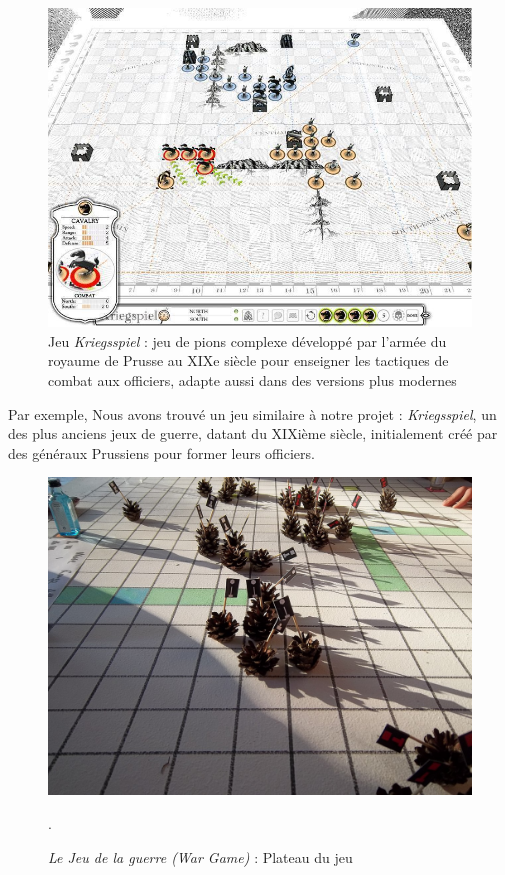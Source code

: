 \begin{figure}[H]
    \centering
    \includegraphics[scale=0.5]{data/kriegspiel.jpeg}
    \caption{Jeu \textit{Kriegsspiel} : jeu de pions complexe développé par l'armée du royaume de Prusse au XIXe siècle pour enseigner les tactiques de combat aux officiers, adapte aussi dans des versions plus modernes \cite{livermore1879american}}
\end{figure}

Par exemple, Nous avons trouvé un jeu similaire à notre projet : \textit{Kriegsspiel}, un des plus anciens jeux de guerre, datant du XIXième siècle, initialement créé par des généraux Prussiens pour former leurs officiers.

\begin{figure}[H]
    \centering
    \includegraphics[scale=0.2]{data/Cavalry_at_dusk,.jpg}
    \caption{\textit{Le Jeu de la guerre (War Game)} : Plateau du jeu}.
\end{figure}

